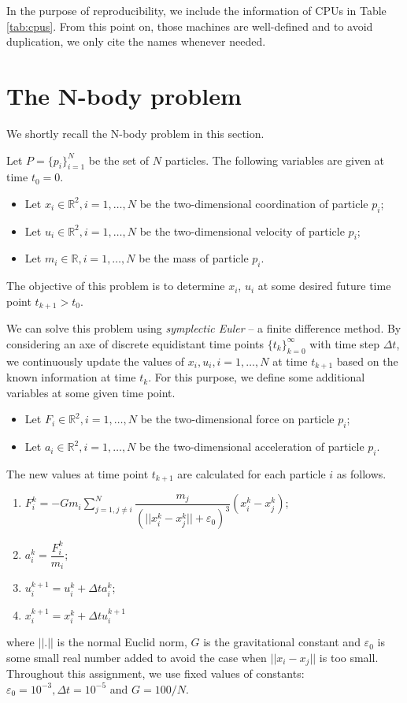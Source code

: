 \documentclass[12pt,oneside,a4paper]{article}
\begin{document}
In the purpose of reproducibility, we include the information of CPUs in Table \ref{tab:cpus}. From this point on, those machines are well-defined and to avoid duplication, we only cite the names whenever needed.
\section{The N-body problem}
\label{sec:problem}
We shortly recall the N-body problem in this section.

Let $P = \{ p_i \}_{i=1}^N$ be the set of $N$ particles. The following variables are given at time $t_0 = 0$.

\begin{itemize}
\item Let $x_i\in \mathbb{R}^2, i = 1,\dots,N$ be the two-dimensional coordination of particle $p_i$;
\item Let $u_i\in \mathbb{R}^2, i = 1,\dots,N$ be the two-dimensional velocity of particle $p_i$;
\item Let $m_i\in \mathbb{R}, i = 1,\dots,N$ be the mass of particle $p_i$.
\end{itemize}

The objective of this problem is to determine $x_i$, $u_i$ at some desired future time point $t_{k+1} > t_0$.
 
We can solve this problem using \textit{symplectic Euler} -- a finite difference method. By considering an axe of discrete equidistant time points $\{ t_k \}_{k=0}^\infty$ with time step $\Delta t$, we continuously update the values of $x_i, u_i, i=1,\dots,N$ at time $t_{k+1}$ based on the known information at time $t_k$. For this purpose, we define some additional variables at some given time point.

\begin{itemize}
\item Let $F_i\in \mathbb{R}^2, i = 1,\dots,N$ be the two-dimensional force on particle $p_i$;
\item Let $a_i\in \mathbb{R}^2, i = 1,\dots,N$ be the two-dimensional acceleration of particle $p_i$.
\end{itemize}

The new values at time point $t_{k+1}$ are calculated for each particle $i$ as follows.
\begin{enumerate}
\item $\displaystyle F_i^k = -G m_i \sum_{j=1, j\neq i}^N \dfrac{m_j}{(||x_i^k - x_j^k||+\varepsilon_0)^3} (x_i^k - x_j^k)$;
\item $a_i^k = \dfrac{F_i^{k}}{m_i}$;
\item $u_i^{k+1} = u_i^{k} + \Delta t a_i^{k}$;
\item $x_i^{k+1} = x_i^{k} + \Delta t u_i^{k+1}$
\end{enumerate}
where $||.||$ is the normal Euclid norm, $G$ is the gravitational constant and $\varepsilon_0$ is some small real number added to avoid the case when $||x_i - x_j||$ is too small. Throughout this assignment, we use fixed values of constants: $\varepsilon_0 = 10^{-3}, \Delta t = 10^{-5}$ and $G = 100/N$.
\end{document}
